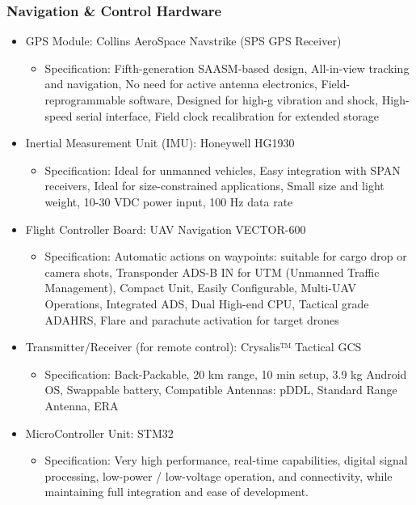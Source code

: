 \subsubsection{Navigation \& Control Hardware}
\begin{itemize}
    \item GPS Module: Collins AeroSpace Navstrike (SPS GPS Receiver)
    \begin{itemize}
        \item Specification: Fifth-generation SAASM-based design, All-in-view tracking and navigation, No need for active antenna electronics, Field-reprogrammable software, Designed for high-g vibration and shock, High-speed serial interface, Field clock recalibration for extended storage
    \end{itemize}
    \item Inertial Measurement Unit (IMU): Honeywell HG1930
    \begin{itemize}
        \item Specification: Ideal for unmanned vehicles, Easy integration with SPAN receivers, Ideal for size-constrained applications, Small size and light weight, 10-30 VDC power input, 100 Hz data rate
    \end{itemize}
    \item Flight Controller Board: UAV Navigation VECTOR-600
    \begin{itemize}
        \item Specification: Automatic actions on waypoints: suitable for cargo drop or camera shots, Transponder ADS-B IN for UTM (Unmanned Traffic Management), Compact Unit, Easily Configurable, Multi-UAV Operations, Integrated ADS, Dual High-end CPU, Tactical grade ADAHRS, Flare and parachute activation for target drones
    \end{itemize}
    \item Transmitter/Receiver (for remote control): Crysalis™ Tactical GCS
    \begin{itemize}
        \item Specification: Back-Packable, 20 km range, 10 min setup, 3.9 kg Android OS, Swappable battery, Compatible Antennas: pDDL, Standard Range Antenna, ERA
    \end{itemize}
    \item MicroController Unit: STM32
    \begin{itemize}
        \item Specification: Very high performance, real-time capabilities, digital signal processing, low-power / low-voltage operation, and connectivity, while maintaining full integration and ease of development.
    \end{itemize}
\end{itemize}

